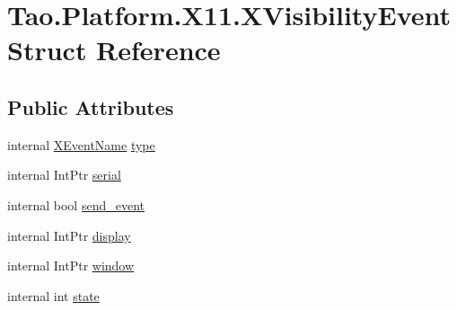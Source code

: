 \hypertarget{struct_tao_1_1_platform_1_1_x11_1_1_x_visibility_event}{
\section{Tao.Platform.X11.XVisibilityEvent Struct Reference}
\label{struct_tao_1_1_platform_1_1_x11_1_1_x_visibility_event}
}
\subsection*{Public Attributes}
\begin{DoxyCompactItemize}
\item 
internal \hyperlink{namespace_tao_1_1_platform_1_1_x11_aff81ed5b8778e1ea8e872861dff9f146}{XEventName} \hyperlink{struct_tao_1_1_platform_1_1_x11_1_1_x_visibility_event_a913a9a41138e2b83156f13307fa0c7a5}{type}
\item 
internal IntPtr \hyperlink{struct_tao_1_1_platform_1_1_x11_1_1_x_visibility_event_aaeb54fa34e94b90552d0fd8d161abe18}{serial}
\item 
internal bool \hyperlink{struct_tao_1_1_platform_1_1_x11_1_1_x_visibility_event_a58d5630d51591ab3ceb573cf99d2e49d}{send\_\-event}
\item 
internal IntPtr \hyperlink{struct_tao_1_1_platform_1_1_x11_1_1_x_visibility_event_a6ae46a7a76d60e78d8f6e377ce91ffa0}{display}
\item 
internal IntPtr \hyperlink{struct_tao_1_1_platform_1_1_x11_1_1_x_visibility_event_ae261d631e7de6c8a886e3f8fedbe8e95}{window}
\item 
internal int \hyperlink{struct_tao_1_1_platform_1_1_x11_1_1_x_visibility_event_a7e9bffd2bc39421bd7e085e019ae74ca}{state}
\end{DoxyCompactItemize}


